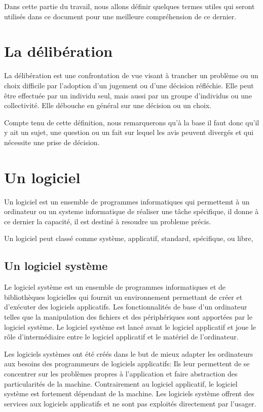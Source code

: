 Dans cette partie du travail, nous allons définir quelques termes utiles qui seront utilisés dans ce document
pour une meilleure compréhension de ce dernier.

\section{La délibération}\label{sec:deliberation}
La délibération est une confrontation de vue
visant à trancher un problème ou un choix difficile par l'adoption d'un
jugement ou d'une décision réfléchie. Elle peut être effectuée par un individu seul,
mais aussi par un groupe d'individus ou une collectivité. Elle débouche en général sur
une décision ou un choix.

Compte tenu de cette définition, nous remarquerons qu'à la base il faut donc qu'il y ait
un sujet, une question ou un fait sur lequel les avis peuvent divergés et qui nécessite
une prise de décision.
\section{Un logiciel}\label{sec:application}
Un logiciel est un ensemble de programmes informatiques qui
permettemt à un ordinateur ou un systeme informatique de réaliser une t\^ache spécifique,
il donne à ce dernier la capacité, il est destiné à resoudre un probleme précis.

Un logiciel peut classé comme système, applicatif, standard, spécifique, ou libre,

\subsection{Un logiciel système}\label{subsec:logiciel-systeme}
Le logiciel système est un ensemble de programmes informatiques et de bibliothèques logicielles
qui fournit un environnement permettant de créer et d'exécuter des logiciels applicatifs.
Les fonctionnalités de base d'un ordinateur telles que la manipulation des fichiers et
des périphériques sont apportées par le logiciel système. Le logiciel système est lancé avant le
logiciel applicatif et joue le rôle d'intermédiaire entre le logiciel applicatif et le matériel de
l'ordinateur.

Les logiciels systèmes ont été créés dans le but de mieux adapter les ordinateurs aux besoins des
programmeurs de logiciels applicatifs: Ils leur permettent de se concentrer sur les problèmes propres
à l'application et faire abstraction des particularités de la machine. Contrairement au logiciel
applicatif, le logiciel système est fortement dépendant de la machine. Les logiciels système offrent
des services aux logiciels applicatifs et ne sont pas exploités directement par l'usager.

